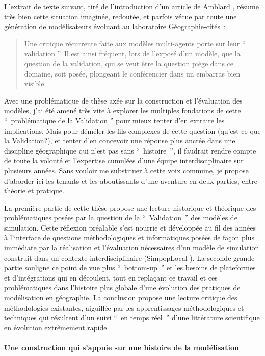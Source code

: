 L’extrait de texte suivant, tiré de l'introduction d'un article de Amblard \autocite{Amblard2006},⁠ résume très bien cette situation imaginée, redoutée, et parfois vécue par toute une génération de modélisateurs évoluant au laboratoire Géographie-cités : 

\blockquote[\cite{Amblard2006}]{Une critique récurrente faite aux modèles multi-agents porte sur leur \enquote{ validation }. Il est ainsi fréquent, lors de l'exposé d'un modèle, que la question de la validation, qui se veut être la question piège dans ce domaine, soit posée, plongeant le conférencier dans un embarras bien visible.}

Avec une problématique de thèse axée sur la construction et l'évaluation des modèles, j’ai été amené très vite à explorer les multiples fondations de cette \enquote{ problématique de la Validation } pour mieux tenter d'en extraire les implications. Mais pour déméler les fils complexes de cette question (qu'est ce que la Validation?), et tenter d'en concevoir une réponse plus ancrée dans une discipline géographique qui n'est pas sans \enquote{ histoire }, il faudrait rendre compte de toute la volonté et l'expertise cumulées d'une équipe interdisciplinaire sur plusieurs années. Sans vouloir me substituer à cette voix commune, je propose d'aborder ici les tenants et les aboutissants d'une aventure en deux parties, entre théorie et pratique.

La première partie de cette thèse propose une lecture historique et théorique des problématiques posées par la question de la \enquote{ Validation } des modèles de simulation. Cette réflexion préalable s'est nourrie et développée au fil des années à l'interface de questions méthodologiques et informatiques posées de façon plus immédiate par la réalisation et l'évaluation nécessaires d'un modèle de simulation construit dans un contexte interdisciplinaire (SimpopLocal \autocite{Schmitt2015}). La seconde grande partie souligne ce point de vue plus \foreignquote{english}{ bottom-up } et les besoins de plateformes et d'intégrations qui en découlent, tout en replaçant ce travail et ces problématiques dans l'histoire plus globale d'une évolution des pratiques de modélisation en géographie. La conclusion propose une lecture critique des méthodologies existantes, aiguillée par les apprentissages méthodologiques et techniques qui résultent d’un suivi \enquote{ en temps réel } d’une littérature scientifique en évolution extrêmement rapide.  

\paragraph*{Une construction qui s’appuie sur une histoire de la modélisation}

